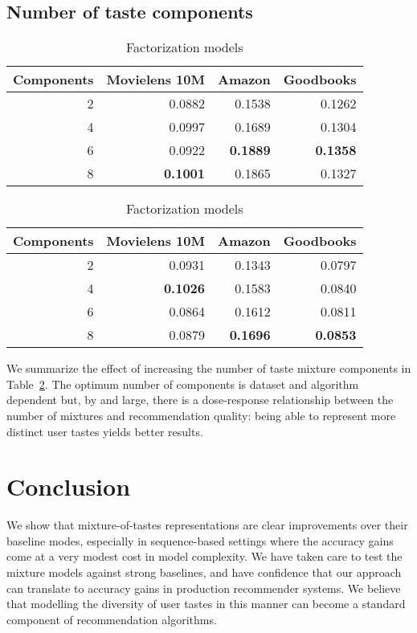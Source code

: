 \documentclass[sigconf]{acmart}
\begin{document}
\subsection{Number of taste components}
\begin{table}
\caption{Effect of number of mixture components}
\label{tab:nummixtures}
\begin{subtable}{\columnwidth}
\caption{Sequence models}
\begin{tabularx}{\columnwidth}{rrrr}
\toprule
   Components &   Movielens 10M &   Amazon &   Goodbooks \\
\midrule
            2 &          0.0882 &   0.1538 &      0.1262 \\
            4 &          0.0997 &   0.1689 &      0.1304 \\
            6 &          0.0922 &   \textbf{0.1889} &      \textbf{0.1358} \\
            8 &          \textbf{0.1001} &   0.1865 &      0.1327 \\
\bottomrule
\end{tabularx}
\end{subtable}
\hspace{\fill}
\begin{subtable}{\columnwidth}
\caption{Factorization models}
\begin{tabularx}{\columnwidth}{rrrr}
\toprule
   Components &   Movielens 10M &   Amazon &   Goodbooks \\
\midrule
            2 &          0.0931 &   0.1343 &      0.0797 \\
            4 &          \textbf{0.1026} &   0.1583 &      0.0840 \\
            6 &          0.0864 &   0.1612 &      0.0811 \\
            8 &          0.0879 &   \textbf{0.1696} &      \textbf{0.0853} \\
\bottomrule
\end{tabularx}
\end{subtable}\end{table}
We summarize the effect of increasing the number of taste mixture components in Table~\ref{tab:nummixtures}. The optimum number of components is dataset and algorithm dependent but, by and large, there is a dose-response relationship between the number of mixtures and recommendation quality: being able to represent more distinct user tastes yields better results.

\section{Conclusion}
We show that mixture-of-tastes representations are clear improvements over their baseline modes, especially in sequence-based settings where the accuracy gains come at a very modest cost in model complexity. We have taken care to test the mixture models against strong baselines, and have confidence that our approach can translate to accuracy gains in production recommender systems. We believe that modelling the diversity of user tastes in this manner can become a standard component of recommendation algorithms.



\end{document}
